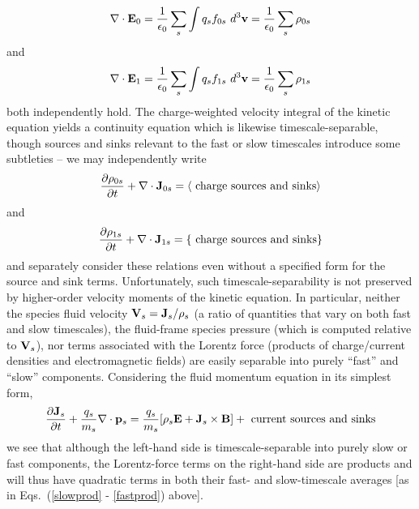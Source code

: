 \begin{equation}
\nabla \cdot {\bf E}_{0} = {1 \over \epsilon_{0}} \sum_{s} \int q_{s} f_{0s}~d^{3}{\bf v}
= {1 \over \epsilon_{0}} \sum_{s} \rho_{0s}
\end{equation}
and
\begin{equation}
\nabla \cdot {\bf E}_{1} = {1 \over \epsilon_{0}} \sum_{s} \int q_{s} f_{1s}~d^{3}{\bf v}
= {1 \over \epsilon_{0}} \sum_{s} \rho_{1s}
\end{equation}
both independently hold.  The charge-weighted velocity integral of the kinetic equation yields a
continuity equation which is likewise timescale-separable, though
sources and sinks relevant to the fast or slow timescales introduce some subtleties -- we
may independently write
\begin{equation}
{\partial \rho_{0s} \over \partial t} + \nabla \cdot {\bf J}_{0s} = \langle \mbox{~charge sources and sinks} \rangle
\end{equation}
and
\begin{equation}
{\partial \rho_{1s} \over \partial t} + \nabla \cdot {\bf J}_{1s} = \{ \mbox{~charge sources and sinks} \}
\end{equation}
and separately consider these relations even without a specified form for the source and sink
terms.  
Unfortunately, such timescale-separability is not preserved by higher-order
velocity moments of the kinetic equation.
In particular, neither the species fluid velocity ${\bf V}_{s} = {\bf J}_{s}/\rho_{s}$ (a ratio of 
quantities that vary on both fast and slow timescales), the fluid-frame species pressure (which 
is computed relative to ${\bf V}_{s}$), 
nor terms associated with the Lorentz force (products of charge/current
densities and electromagnetic fields) are easily separable into purely ``fast'' and ``slow''
components.  Considering the fluid momentum equation in its simplest form,
\begin{eqnarray}
{\partial {\bf J}_{s} \over \partial t} 
+ {q_{s} \over m_{s}} \nabla \cdot {\mathbf p}_{s} = {q_{s} \over m_{s}} [\rho_{s} {\bf E} + {\bf J}_{s}
\times {\bf B}] + \mbox{~current sources and sinks}
\label{fluidmomentum}
\end{eqnarray}
we see that although the left-hand side is timescale-separable into purely slow or fast components, the
Lorentz-force terms on the right-hand side are products and will thus have quadratic terms in
both their fast- and slow-timescale averages [as in Eqs.~(\ref{slowprod} - \ref{fastprod}) above].  
